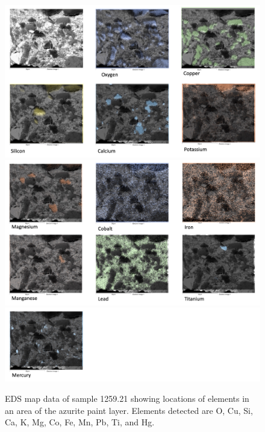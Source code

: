 \begin{figure}[H]
\centering
\begin{minipage}[t]{\linewidth}
  \centering
  \includegraphics[width=0.9\linewidth]{1259.21_mapdata_1}
\hfill
\includegraphics[width=0.9\linewidth]{1259.21_mapdata_2}
\hfill
\includegraphics[width=0.9\linewidth]{1259.21_mapdata_3}
\hfill
\end{minipage}
\caption[EDS map data, sample 1259.21.]{EDS map data of sample 1259.21 showing locations of elements in an area of the azurite paint layer. Elements detected are O, Cu, Si, Ca, K, Mg, Co, Fe, Mn, Pb, Ti, and Hg.}
\label{fig:1259.21_mapdata}
\end{figure}


